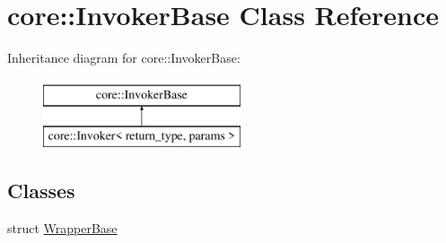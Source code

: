 \hypertarget{classcore_1_1_invoker_base}{}\section{core\+:\+:Invoker\+Base Class Reference}
\label{classcore_1_1_invoker_base}
Inheritance diagram for core\+:\+:Invoker\+Base\+:\begin{figure}[H]
\begin{center}
\leavevmode
\includegraphics[height=2.000000cm]{d9/d1c/classcore_1_1_invoker_base}
\end{center}
\end{figure}
\subsection*{Classes}
\begin{DoxyCompactItemize}
\item 
struct \hyperlink{structcore_1_1_invoker_base_1_1_wrapper_base}{Wrapper\+Base}
\end{DoxyCompactItemize}
